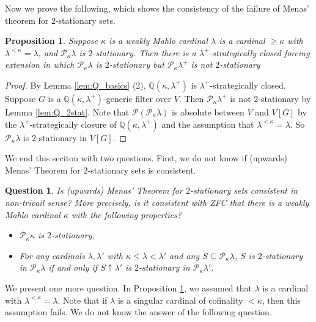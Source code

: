 \documentclass[a4paper,12pt,reqno,oneside]{amsart}
\theoremstyle{plain}
\newtheorem{prop}[theorem]{Proposition}
\newtheorem{question}[theorem]{Question}
\newcommand{\mbb}{\mathbb}
\newcommand{\mcal}{\mathcal}
\begin{document}
Now we prove the following, which shows the consistency of the failure of Menas' theorem for $2$-stationary sets.


\begin{prop} \label{fum2stp}
Suppose $\kappa$ is a weakly Mahlo cardinal $\lambda$ is a cardinal $\geq \kappa$ with $\lambda^{< \kappa} = \lambda$, and $\mcal{P}_\kappa \lambda$ is $2$-stationary. Then there is a $\lambda^+$-strategically closed forcing extension in which $\mcal{P}_\kappa \lambda$ is $2$-stationary but $\mcal{P}_\kappa \lambda^+$ is not $2$-stationary
\end{prop}

\begin{proof}
By Lemma \ref{lem:Q_basics} (2), $\mbb{Q} ( \kappa , \lambda^+ )$ is $\lambda^+$-strategically closed. Suppose $G$ is a $\mbb{Q} ( \kappa , \lambda^+ )$-generic filter over $V$. Then $\mcal{P}_\kappa \lambda^+$ is not $2$-stationary by Lemma \ref{lem:Q_2stat}. Note that $\mcal{P} ( \mcal{P}_\kappa \lambda )$ is absolute between $V$ and $V[G]$ by the $\lambda^+$-strategically closure of $\mbb{Q} ( \kappa , \lambda^+ )$ and the assumption that $\lambda^{< \kappa} = \lambda$. So $\mcal{P}_\kappa \lambda$ is $2$-stationary in $V[G]$.
\end{proof}  %


We end this seciton with two questions. First, we do not know if (upwards) Menas' Theorem for $2$-stationary sets is consistent.

\begin{question}
Is (upwards) Menas' Theorem for $2$-stationary sets consistent in non-trivail sense? More precisely, is it consistent with ZFC that there is a weakly Mahlo cardinal $\kappa$ with the following properties?
\begin{itemize}
\item[(i)] $\mcal{P}_\kappa \kappa$ is $2$-stationary,
\item[(ii)] For any cardinals $\lambda , \lambda '$ with $\kappa \leq \lambda < \lambda '$ and any $S \subseteq \mcal{P}_\kappa \lambda$, $S$ is $2$-stationary in $\mcal{P}_\kappa \lambda$ if and only if $S \uparrow \lambda '$ is $2$-stationary in $\mcal{P}_\kappa \lambda '$.
\end{itemize}
\end{question}


We present one more question. In Proposition \ref{fum2stp}, we assumed that $\lambda$ is a cardinal with $\lambda^{< \kappa} = \lambda$. Note that if $\lambda$ is a singular cardinal of cofinality $< \kappa$, then this assumption fails. We do not know the answer of the following question.
\end{document}
